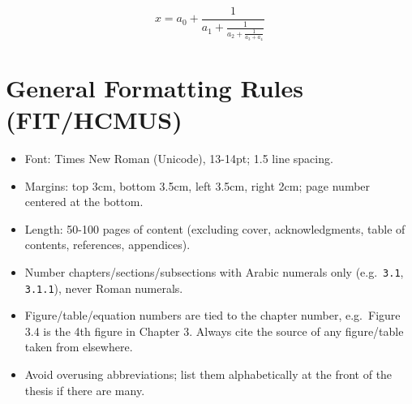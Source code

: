 \begin{equation} \label{eu_eqn}
x = a_0 + \frac{1}{a_1 + \frac{1}{a_2 + \frac{1}{a_3 + a_4}}}
\end{equation}

\section{General Formatting Rules (FIT/HCMUS)}

\begin{itemize}
\item Font: Times New Roman (Unicode), 13-14pt; 1.5 line spacing.
\item Margins: top 3cm, bottom 3.5cm, left 3.5cm, right 2cm; page number
centered at the bottom.
\item Length: 50-100 pages of content (excluding cover, acknowledgments,
table of contents, references, appendices).
\item Number chapters/sections/subsections with Arabic numerals only
(e.g.\ \texttt{3.1}, \texttt{3.1.1}), never Roman numerals.
\item Figure/table/equation numbers are tied to the chapter number, e.g.\
Figure 3.4 is the 4th figure in Chapter 3. Always cite the source of any
figure/table taken from elsewhere.
\item Avoid overusing abbreviations; list them alphabetically at the front of
the thesis if there are many.
\end{itemize}
